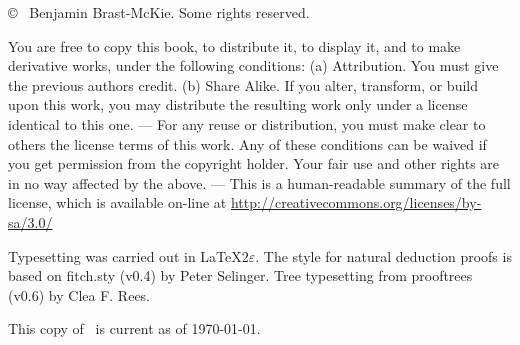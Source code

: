 \strut

\vfill
{
\copyright\  Benjamin Brast-McKie. Some rights reserved.
}

{\footnotesize
You are free to copy this book, to distribute it, to display it, and to make derivative works, under the following conditions: (a) Attribution. You must give the previous authors credit. (b) Share Alike. If you alter, transform, or build upon this work, you may distribute the resulting work only under a license identical to this one. --- For any reuse or distribution, you must make clear to others the license terms of this work. Any of these conditions can be waived if you get permission from the copyright holder. Your fair use and other rights are in no way affected by the above. --- This is a human-readable summary of the full license, which is available on-line at \url{http://creativecommons.org/licenses/by-sa/3.0/}

Typesetting was carried out  in \LaTeX$2\varepsilon$.
The style for natural deduction proofs is based on fitch.sty (v0.4) by Peter Selinger. 
Tree typesetting from prooftrees (v0.6) by Clea F. Rees.

This copy of \forallx\ is current as of \today.
}
